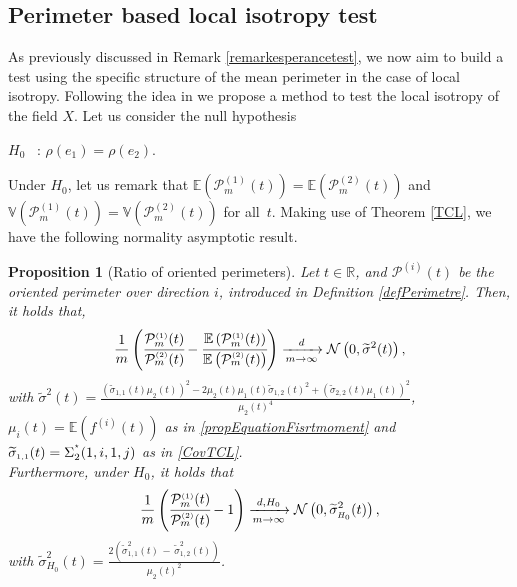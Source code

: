 \documentclass[12pt]{article}
\renewcommand{\tilde}{\widetilde}
\theoremstyle{Theorem}
\newtheorem{Proposition}[Theorem]{Proposition}
\theoremstyle{definition}
\begin{document}
\subsection{Perimeter based local isotropy test}
As previously discussed in Remark \ref{remarkesperancetest}, we now aim to build a test using the specific structure of the mean perimeter in the case of local isotropy. Following the idea  in \cite{bierme2019}  we propose a method to test the local isotropy of the field $X$.
Let us consider the null hypothesis
\begin{center}
  $H_{0}$ \, :\; $\rho(e_1) = \rho(e_2)$.
\end{center}
Under $H_{0}$, let us remark that $\mathbb{E}\left(\mathcal{P}^{\scriptscriptstyle  (1) }_{m}(t) \right)= \mathbb{E}\left(\mathcal{P}^{\scriptscriptstyle  (2) }_{m}(t)\right)$ and $\mathbb{V}\left(\mathcal{P}^{\scriptscriptstyle  (1) }_{m}(t) \right)= \mathbb{V}\left(\mathcal{P}^{\scriptscriptstyle  (2) }_{m}(t)\right)$ for all~$t$. Making use of Theorem \ref{TCL}, we have the following normality asymptotic result. 
\begin{Proposition}[Ratio of oriented perimeters]\label{deltamethodgeneralprop} 
Let  $t \in \mathbb{R}$, and $\mathcal{P}^{\scriptscriptstyle  (i) }(t)$ be the oriented perimeter over direction $i$, introduced in Definition \ref{defPerimetre}. Then, it holds that,
\begin{equation*}
\frac{1}{m}\left(\cfrac{\mathcal{P}^{\scriptscriptstyle  (1) }_{m}(t)}{\mathcal{P}^{\scriptscriptstyle  (2)}_{m}(t)} - \cfrac{\mathbb{E}\left(\mathcal{P}^{\scriptscriptstyle  (1) }_{m}(t)\right)}{\mathbb{E}\left(\mathcal{P}^{\scriptscriptstyle  (2)}_{m}(t)\right)} \right)  \xrightarrow[m \to \infty]{d} \mathcal{N}\left(0,  \tilde{\sigma}^{2}(t) \right),
\end{equation*}
with $\tilde{\sigma}^{2}(t) = \frac{(\tilde{\sigma}_{\scriptscriptstyle 1,1}(t)\mu_{2}(t))^{2} - 2\mu_{2}(t)\mu_{1}(t)\tilde{\sigma}_{\scriptscriptstyle 1,2}(t)^{2} +(\tilde{\sigma}_{\scriptscriptstyle 2,2}(t)\mu_{1}(t))^{2}}{\mu_{2}(t)^4}$, $\mu_{i}(t) = \mathbb{E}(f^{(i)}(t))$ as in \eqref{propEquationFisrtmoment} \linebreak and $\tilde{\sigma}_{\scriptscriptstyle 1,1}(t) = \Sigma^{\textcolor{white}{ }^{\star}}_{2}(1,i,1,j)$ as in \eqref{CovTCL}. \\
Furthermore, under $H_{0}$, it holds that
\begin{equation}\label{ratiounderH0}
\frac{1}{m}\left(\cfrac{\mathcal{P}^{\scriptscriptstyle  (1) }_{m}(t)}{\mathcal{P}^{\scriptscriptstyle  (2) }_{m}(t)} - 1 \right)  \xrightarrow[m \to \infty]{d, H_0} \mathcal{N}\left(0,  \tilde{\sigma}_{\scriptscriptstyle H_{0}}^{2}(t)  \right),
\end{equation} 
with $\tilde{\sigma}_{\scriptscriptstyle H_{0}}^{2}(t) = \frac{2\left(\tilde{\sigma}_{\scriptscriptstyle 1,1}^{2}(t) \, - \, \tilde{\sigma}_{\scriptscriptstyle 1,2}^{2}(t)\right)}{\mu_{2}(t)^2}$.
\end{Proposition}
\end{document}
